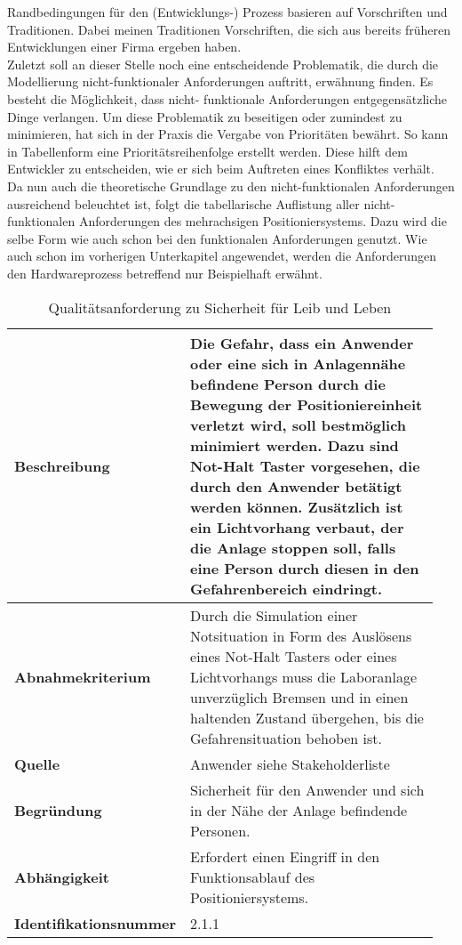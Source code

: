\documentclass[../Bachelorarbeit.tex]{subfiles}
\begin{document}
Randbedingungen für den (Entwicklungs-) Prozess basieren auf Vorschriften und Traditionen. Dabei meinen Traditionen Vorschriften, die sich aus bereits früheren Entwicklungen einer Firma ergeben haben.\\ %
Zuletzt soll an dieser Stelle noch eine entscheidende Problematik, die durch die Modellierung nicht-funktionaler Anforderungen auftritt, erwähnung finden. Es besteht die Möglichkeit, dass nicht- funktionale Anforderungen entgegensätzliche Dinge verlangen. Um diese Problematik zu beseitigen oder zumindest zu minimieren, hat sich in der Praxis die Vergabe von Prioritäten bewährt. So kann in Tabellenform eine Prioritätsreihenfolge erstellt werden. Diese hilft dem Entwickler zu entscheiden, wie er sich beim Auftreten eines Konfliktes verhält.\\ %
Da nun auch die theoretische Grundlage zu den nicht-funktionalen Anforderungen ausreichend beleuchtet ist, folgt die tabellarische Auflistung aller nicht-funktionalen Anforderungen des mehrachsigen Positioniersystems. Dazu wird die selbe Form wie auch schon bei den funktionalen Anforderungen genutzt. Wie auch schon im vorherigen Unterkapitel angewendet, werden die Anforderungen den Hardwareprozess betreffend nur Beispielhaft erwähnt.

\begin{table}[ht]
    \centering
    \begin{tabular}{| p{0.35\linewidth} | p{0.6\linewidth} |}
        \hline
        \textbf{Beschreibung} & Die Gefahr, dass ein Anwender oder eine sich in Anlagennähe befindene Person durch die Bewegung der Positioniereinheit verletzt wird, soll bestmöglich minimiert werden. Dazu sind Not-Halt Taster vorgesehen, die durch den Anwender betätigt werden können. Zusätzlich ist ein Lichtvorhang verbaut, der die Anlage stoppen soll, falls eine Person durch diesen in den Gefahrenbereich eindringt. \\ \hline
        \textbf{Abnahmekriterium} & Durch die Simulation einer Notsituation in Form des Auslösens eines Not-Halt Tasters oder eines Lichtvorhangs muss die Laboranlage unverzüglich Bremsen und in einen haltenden Zustand übergehen, bis die Gefahrensituation behoben ist. \\ \hline
        \textbf{Quelle} & Anwender siehe Stakeholderliste \\ \hline
        \textbf{Begründung} & Sicherheit für den Anwender und sich in der Nähe der Anlage befindende Personen. \\ \hline
        \textbf{Abhängigkeit} & Erfordert einen Eingriff in den Funktionsablauf des Positioniersystems. \\ \hline
        \textbf{Identifikationsnummer} & 2.1.1 \\ \hline
    \end{tabular}
    \caption{Qualitätsanforderung zu Sicherheit für Leib und Leben}
    \label{tab:my-table2}
\end{table}

\end{document}
